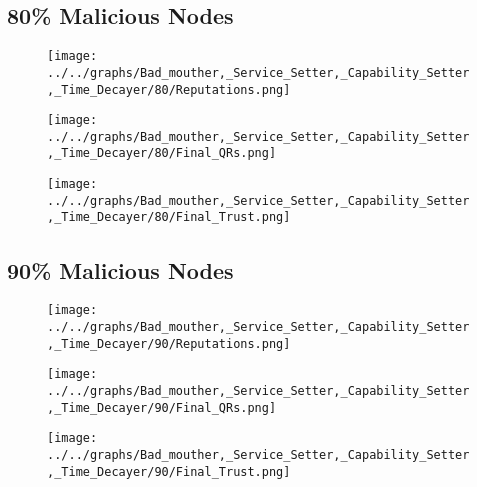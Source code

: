 \begin{minipage}[t]{0.49\columnwidth}
\subsection*{80\% Malicious Nodes}
    \begin{figure}[H]
        \centering
        \texttt{[image: ../../graphs/Bad\_mouther,\_Service\_Setter,\_Capability\_Setter,\_Time\_Decayer/80/Reputations.png]}
    \end{figure}
    \begin{figure}[H]
        \centering
        \texttt{[image: ../../graphs/Bad\_mouther,\_Service\_Setter,\_Capability\_Setter,\_Time\_Decayer/80/Final\_QRs.png]}
    \end{figure}
\end{minipage}
\begin{minipage}[t]{0.49\columnwidth}
    \begin{figure}[H]
        \centering
        \texttt{[image: ../../graphs/Bad\_mouther,\_Service\_Setter,\_Capability\_Setter,\_Time\_Decayer/80/Final\_Trust.png]}
    \end{figure}
\end{minipage}

\begin{minipage}[t]{0.49\columnwidth}
\subsection*{90\% Malicious Nodes}
    \begin{figure}[H]
        \centering
        \texttt{[image: ../../graphs/Bad\_mouther,\_Service\_Setter,\_Capability\_Setter,\_Time\_Decayer/90/Reputations.png]}
    \end{figure}
    \begin{figure}[H]
        \centering
        \texttt{[image: ../../graphs/Bad\_mouther,\_Service\_Setter,\_Capability\_Setter,\_Time\_Decayer/90/Final\_QRs.png]}
    \end{figure}
\end{minipage}
\begin{minipage}[t]{0.49\columnwidth}
    \begin{figure}[H]
        \centering
        \texttt{[image: ../../graphs/Bad\_mouther,\_Service\_Setter,\_Capability\_Setter,\_Time\_Decayer/90/Final\_Trust.png]}
    \end{figure}
\end{minipage}

